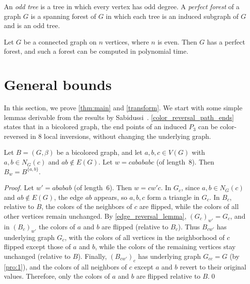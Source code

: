 \documentclass[runningheads,orivec]{llncs}
\begin{document}
An \textit{odd tree} is a tree in which every vertex has odd degree.  
A \textit{perfect forest} of a graph $G$ is a spanning forest of $G$ in which each tree is an induced subgraph of $G$ and is an odd tree.

\begin{proposition}\label{perfect_forest_theo}
Let $G$ be a connected graph on $n$ vertices, where $n$ is even. Then $G$ has a perfect forest, and such a forest can be computed in polynomial time.
\end{proposition}

\section{General bounds}\label{Section_3}
In this section, we prove \autoref{thm:main} and \autoref{transform}. We start with some simple lemmas derivable from the results by Sabidussi~\cite{sabidussi1987color}.
\autoref{color_reversal_path_ends} states that in a bicolored graph, the end points of an induced $P_3$ can be color-reversed in 8 local inversions, without changing the underlying graph.

\begin{lemma}\label{color_reversal_path_ends}
Let $B=(G,\beta)$ be a bicolored graph, and let $a,b,c\in V(G)$ with $a,b\in N_G(c)$ and $ab\notin E(G)$.  
Let $w=cabababc$ (of length~$8$). Then $B_w = B^{\{a,b\}}.$
\end{lemma}
\begin{proof}
Let $w'=ababab$ (of length~$6$). Then $w = cw'c$. 
In $G_c$, since $a,b\in N_G(c)$ and $ab\notin E(G)$, the edge $ab$ appears, so $a,b,c$ form a triangle in $G_c$.  
In $B_c$, relative to $B$, the colors of the neighbors of $c$ are flipped, while the colors of all other vertices remain unchanged. 
By \autoref{edge_reversal_lemma}, $(G_c)_{w'}=G_c$, and in $(B_c)_{w'}$ the colors of $a$ and $b$ are flipped (relative to $B_c$). 
Thus $B_{cw'}$ has underlying graph $G_c$, with the colors of all vertices in the neighborhood of $c$ flipped except those of $a$ and $b$, while the colors of the remaining vertices stay unchanged (relative to $B$). 
Finally, $(B_{cw'})_c$ has underlying graph $G_{cc}=G$ (by \autoref{pro:1}), and the colors of all neighbors of $c$ except $a$ and $b$ revert to their original values. Therefore, only the colors of $a$ and $b$ are flipped relative to $B$.\qed
\end{proof}
\end{document}
